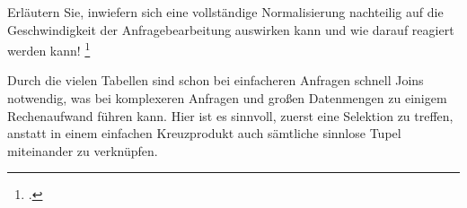 \documentclass{bschlangaul-aufgabe}
\begin{document}
\begin{enumerate}
Erläutern Sie, inwiefern sich eine vollständige Normalisierung
nachteilig auf die Geschwindigkeit der Anfragebearbeitung auswirken kann
und wie darauf reagiert werden kann!
\footcite[Aufgabe 10: Nachteile der Normalisierung]{db:ab:klausurvorbereitung}

\begin{bAntwort}
Durch die vielen Tabellen sind schon bei einfacheren Anfragen schnell
Joins notwendig, was bei komplexeren Anfragen und großen Datenmengen zu
einigem Rechenaufwand führen kann. Hier ist es sinnvoll, zuerst eine
Selektion zu treffen, anstatt in einem einfachen Kreuzprodukt
auch sämtliche sinnlose Tupel miteinander zu verknüpfen.
\end{bAntwort}
\end{enumerate}
\end{document}
